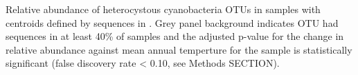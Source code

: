 Relative abundance of heterocystous cyanobacteria OTUs in \citet{Garcia_Pichel_2013} samples with centroids defined by sequences in \citet{Yeager}. Grey panel background indicates OTU had sequences in at least 40\% of samples and the adjusted p-value for the change in relative abundance against mean annual temperture for the sample is statistically significant (false discovery rate < 0.10, see Methods SECTION).
